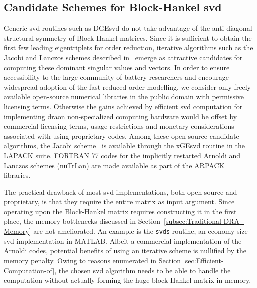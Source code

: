 \subsection{Candidate Schemes for Block-Hankel \gls{svd}}

\begin{figure*}
	\caption{}
	\label{improved_ROM_workflow}
\end{figure*}

Generic \gls{svd} routines such as DGE\gls{svd} do not take advantage of the anti-diagonal
structural symmetry of Block-Hankel matrices. Since it is sufficient
to obtain the first few leading eigentriplets for order reduction,
iterative algorithms such as the Jacobi and Lanczos schemes described
in~\cite{GolubVanLoan2012} emerge as attractive candidates for
computing these dominant singular values and vectors. In order to
ensure accessibility to the large community of battery researchers
and encourage widespread adoption of the fast reduced order modelling,
we consider only freely available open-source numerical libraries
in the public domain with permissive licensing terms. Otherwise the
gains achieved by efficient \gls{svd} computation for implementing \gls{dra}on
non-specialized computing hardware would be offset by commercial licensing
terms, usage restrictions and monetary considerations associated with
using proprietary codes. Among these open-source candidate algorithms,
the Jacobi scheme~\cite{GolubVanLoan2012} is available through
the xGE\gls{svd} routine in the LAPACK suite. FORTRAN 77 codes for the implicitly
restarted Arnoldi and Lanczos schemes (nuTrLan) are made available
as part of the ARPACK~\cite{LehoucqMaschhoffSorensenEtAl2013} libraries.

The practical drawback of most \gls{svd} implementations, both open-source
and proprietary, is that they require the entire matrix as input argument.
Since operating upon the Block-Hankel matrix requires constructing
it in the first place, the memory bottlenecks discussed in Section~\ref{subsec:Traditional-DRA--Memory}
are not ameliorated. An example is the \texttt{svds} routine, an economy
size \gls{svd} implementation in MATLAB. Albeit a commercial implementation
of the Arnoldi codes, potential benefits of using an iterative scheme
is nullified by the memory penalty. Owing to reasons enumerated in
Section \ref{sec:Efficient-Computation-of}, the chosen \gls{svd} algorithm
needs to be able to handle the computation without actually forming
the huge block-Hankel matrix in memory.


